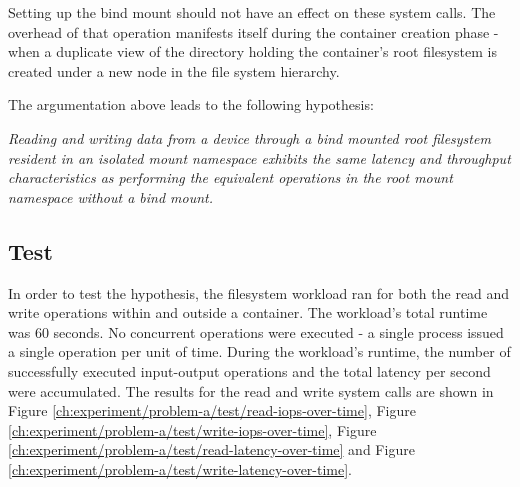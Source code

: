 Setting up the bind mount should not have an effect on these system calls. The overhead of that operation manifests itself
during the container creation phase - when a duplicate view of the directory holding 
the container's root filesystem is created under a new node in the file system hierarchy.

The argumentation above leads to the following hypothesis:

\textit{Reading and writing data from a device through a bind mounted root filesystem resident in an isolated mount namespace exhibits
the same latency and throughput characteristics as performing the equivalent operations in the root mount namespace without a bind mount.}

\subsection{Test}
In order to test the hypothesis, the filesystem workload ran for both the read and write 
operations within and outside a container. The workload's total runtime was 60 seconds.
No concurrent operations were executed - a single process issued a single operation per unit of time. 
During the workload's runtime, the number of successfully executed input-output operations and the total latency per second 
were accumulated. The results for the read and write system calls are shown in Figure \ref{ch:experiment/problem-a/test/read-iops-over-time},
Figure \ref{ch:experiment/problem-a/test/write-iops-over-time}, Figure \ref{ch:experiment/problem-a/test/read-latency-over-time} and Figure \ref{ch:experiment/problem-a/test/write-latency-over-time}.

